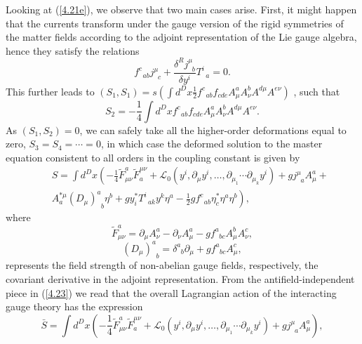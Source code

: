 \documentclass[a4paper,12pt]{article}
\begin{document}
Looking at (\ref{4.21e}), we observe
that two main cases arise. First, it
might happen that the currents transform
under the gauge version of the
rigid symmetries of the matter fields
according to the adjoint
representation of the Lie gauge algebra,
hence they satisfy the relations
\begin{equation}
f_{\;\;ab}^{c}j_{\;\;c}^{\mu }+
\frac{\delta ^{R}j_{\;\;b}^{\mu }}{\delta
y^{i}}T_{\;\;a}^{i}=0.  \label{4.22}
\end{equation}
This further leads to $\left( S_{1},S_{1}\right) =
s\left( \int d^{D}x\frac{1%
}{2}f_{\;\;ab}^{c}f_{cde}A_{\mu }^{a}
A_{\nu }^{b}A^{d\mu }A^{e\nu }\right) $%
, such that
\begin{equation}
S_{2}=-\frac{1}{4}\int d^{D}x
f_{\;\;ab}^{c}f_{cde}A_{\mu }^{a}A_{\nu
}^{b}A^{d\mu }A^{e\nu }.  \label{4.22a}
\end{equation}
As $\left( S_{1},S_{2}\right) =0$, we
can safely take all the higher-order
deformations equal to zero, $S_{3}=S_{4}=
\cdots =0$, in which case the
deformed solution to the master equation
consistent to all orders in the
coupling constant is given by
\begin{eqnarray}
&&S=\int d^{D}x\left( -\frac{1}{4}
\tilde{F}_{\mu \nu }^{a}\tilde{F}_{a}^{\mu
\nu }+{\mathcal{L}}_{0}\left( y^{i},
\partial _{\mu }y^{i},\ldots ,\partial
_{\mu _{1}}\cdots \partial _{\mu _{k}}
y^{i}\right) +gj_{\;\;a}^{\mu }A_{\mu
}^{a}+\right.  \nonumber \\
&&\left. A_{a}^{*\mu }\left(
D_{\mu }\right) _{\;\;b}^{a}\eta
^{b}+gy_{i}^{*}T_{\;\;ak}^{i}y^{k}
\eta ^{a}-\frac{1}{2}gf_{\;\;ab}^{c}\eta
_{c}^{*}\eta ^{a}\eta ^{b}\right) ,  \label{4.23}
\end{eqnarray}
where
\begin{equation}
\tilde{F}_{\mu \nu }^{a}=\partial _{\mu }
A_{\nu }^{a}-\partial _{\nu }A_{\mu
}^{a}-gf_{\;\;bc}^{a}A_{\mu }^{b}A_{\nu }^{c},
\label{4.23a}
\end{equation}
\begin{equation}
\left( D_{\mu }\right) _{\;\;b}^{a}=
\delta _{\;\;b}^{a}\partial _{\mu
}+gf_{\;\;bc}^{a}A_{\mu }^{c},  \label{4.23b}
\end{equation}
represents the field strength of
non-abelian gauge fields, respectively, the
covariant derivative in the adjoint
representation. From the
antifield-independent piece in (\ref{4.23})
we read that the overall
Lagrangian action of the interacting gauge
theory has the expression
\begin{equation}
\bar{S}=\int d^{D}x\left( -\frac{1}{4}
\tilde{F}_{\mu \nu }^{a}\tilde{F}%
_{a}^{\mu \nu }+{\mathcal{L}}_{0}
\left( y^{i},\partial _{\mu }y^{i},\ldots
,\partial _{\mu _{1}}\cdots
\partial _{\mu _{k}}y^{i}\right)
+gj_{\;\;a}^{\mu }A_{\mu }^{a}\right) ,  \label{4.24}
\end{equation}
\end{document}
